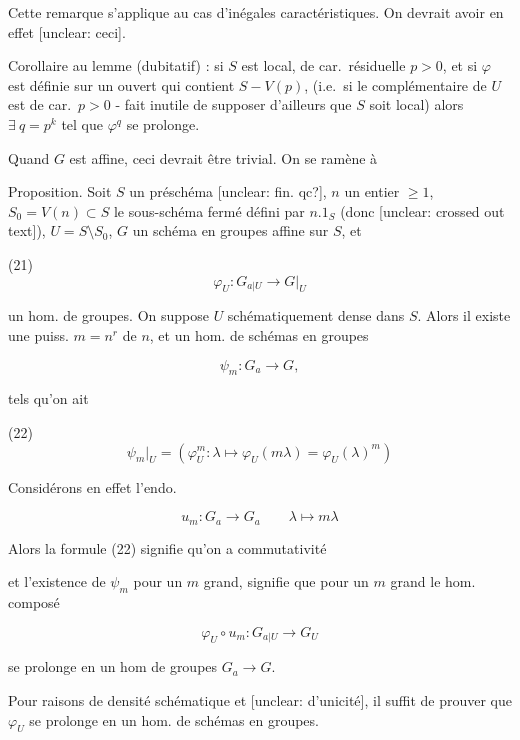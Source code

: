 Cette remarque s'applique au cas d'inégales caractéristiques. On devrait avoir en effet [unclear: ceci].

Corollaire au lemme (dubitatif) : si $S$ est local, de car.\ résiduelle $p>0$, et si $\varphi$ est définie sur un ouvert qui contient $S - V(p)$, (i.e.\ si le complémentaire de $U$ est de car.\ $p>0$ - fait inutile de supposer d'ailleurs que $S$ soit local) alors $\exists \ q=p^k$ tel que $\varphi^q$ se prolonge.

\newpage


Quand $G$ est affine, ceci devrait être trivial. On se ramène à

Proposition. Soit $S$ un préschéma [unclear: fin. qc?], $n$ un entier $\ge 1$, $S_0 = V(n) \subset S$ le sous-schéma fermé défini par $n.1_S$ (donc [unclear: crossed out text]), $U = S \setminus S_0$, $G$ un schéma en groupes affine sur $S$, et

(21) $$ \varphi_U : G_{a|U} \to G|_U $$

un hom. de groupes. On suppose $U$ schématiquement dense dans $S$. Alors il existe une puiss. $m = n^r$ de $n$, et un hom. de schémas en groupes

$$ \psi_m : G_a \to G , $$

tels qu'on ait

(22) $$ \psi_m|_U = (\varphi_U^m : \lambda \mapsto \varphi_U(m\lambda) = \varphi_U(\lambda)^m) $$

Considérons en effet l'endo.

$$ u_m : G_a \to G_a \qquad \lambda \mapsto m\lambda $$

Alors la formule (22) signifie qu'on a commutativité


et l'existence de $\psi_m$ pour un $m$ grand, signifie que pour un $m$ grand le hom. composé

$$ \varphi_U \circ u_m : G_{a|U} \to G_U $$

se prolonge en un hom de groupes $G_a \to G$.

\newpage


Pour raisons de densité schématique et [unclear: d'unicité], il suffit de prouver que $\varphi_U$ se prolonge en un hom. de schémas en groupes.

